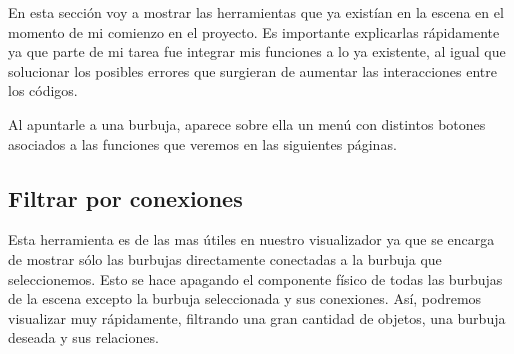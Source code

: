 En esta sección voy a mostrar las herramientas que ya existían en la escena en el momento de mi comienzo en el proyecto. Es importante explicarlas rápidamente ya que parte de mi tarea fue integrar mis funciones a lo ya existente, al igual que solucionar los posibles errores que surgieran de aumentar las interacciones entre los códigos.

Al apuntarle a una burbuja, aparece sobre ella un menú con distintos botones asociados a las funciones que veremos en las siguientes páginas.

\subsection{Filtrar por conexiones}

Esta herramienta es de las mas útiles en nuestro visualizador ya que se encarga de mostrar sólo las burbujas directamente conectadas a la burbuja que seleccionemos. Esto se hace apagando el componente físico de todas las burbujas de la escena excepto la burbuja seleccionada y sus conexiones. Así, podremos visualizar muy rápidamente, filtrando una gran cantidad de objetos, una burbuja deseada y sus relaciones.

